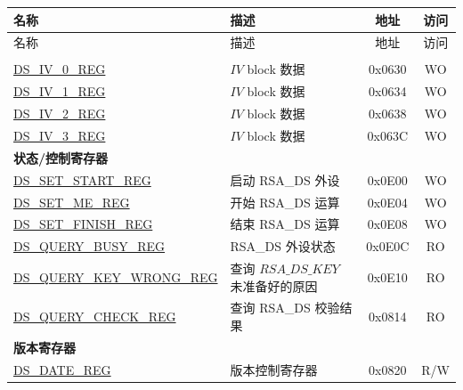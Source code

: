 \begin{longtable}{ | p{5.2cm} | p{6.6cm} | c| c| }
\hline\rowcolor{lightgray}
名称 & 描述 &  地址 & 访问 \\ \hline
\endfirsthead
        \hline
        \rowcolor{lightgray}
名称 & 描述 &  地址 & 访问 \\ \hline

        \endhead
        \endfoot
\multicolumn{4}{|l|}{\textbf{配置寄存器}} \\ \hline
\hyperref[regdesc:DSIVREG]{DS\_IV\_0\_REG}               & \begin{math}IV\end{math} block 数据         & 0x0630 & WO \\ \hline
\hyperref[regdesc:DSIVREG]{DS\_IV\_1\_REG}               & \begin{math}IV\end{math} block 数据          & 0x0634 & WO \\ \hline
\hyperref[regdesc:DSIVREG]{DS\_IV\_2\_REG}               & \begin{math}IV\end{math} block 数据          & 0x0638 & WO \\ \hline
\hyperref[regdesc:DSIVREG]{DS\_IV\_3\_REG}               & \begin{math}IV\end{math} block 数据           & 0x063C & WO \\ \hline
\multicolumn{4}{|l|}{\textbf{状态/控制寄存器}} \\ \hline
\hyperref[regdesc:DSSETSTARTREG]{DS\_SET\_START\_REG}               & 启动 RSA\_DS 外设     & 0x0E00 & WO \\ \hline
\hyperref[regdesc:DSSETMEREG]{DS\_SET\_ME\_REG}                     & 开始 RSA\_DS 运算       & 0x0E04 & WO \\ \hline
\hyperref[regdesc:DSSETFINISHREG]{DS\_SET\_FINISH\_REG}             & 结束 RSA\_DS 运算         & 0x0E08 & WO \\ \hline
\hyperref[regdesc:DSQUERYBUSYREG]{DS\_QUERY\_BUSY\_REG}             & RSA\_DS 外设状态& 0x0E0C & RO \\ \hline
\hyperref[regdesc:DSQUERYKEYWRONGREG]{DS\_QUERY\_KEY\_WRONG\_REG}   & 查询 \begin{math}RSA\_DS\_KEY\end{math} 未准备好的原因       & 0x0E10 & RO \\ \hline
\hyperref[regdesc:DSQUERYCHECKREG]{DS\_QUERY\_CHECK\_REG}           & 查询 RSA\_DS 校验结果    & 0x0814 & RO \\ \hline
\multicolumn{4}{|l|}{\textbf{版本寄存器}} \\ \hline
\hyperref[regdesc:DSDATEREG]{DS\_DATE\_REG}                   & 版本控制寄存器   & 0x0820 & R/W \\ \hline
\end{longtable}

